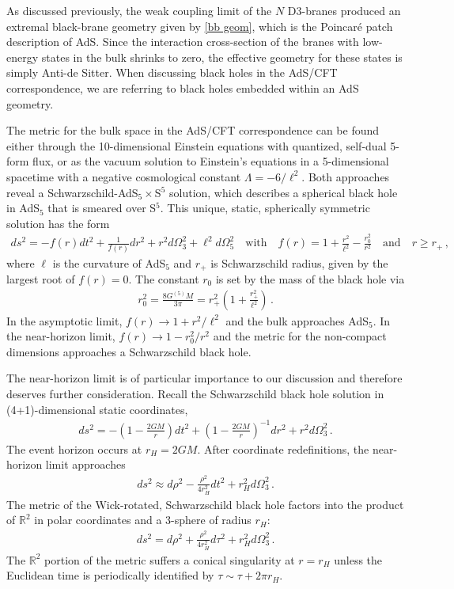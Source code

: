 \documentclass[../PhD.tex]{subfiles}
\begin{document}
As discussed previously, the weak coupling limit of the $N$ D3-branes produced an extremal black-brane geometry given by \eqref{bb geom}, which is the Poincar\'e patch description of AdS. Since the interaction cross-section of the branes with low-energy states in the bulk shrinks to zero, the effective geometry for these states is  simply Anti-de Sitter. When discussing black holes in the AdS/CFT correspondence, we are referring to black holes embedded within an AdS geometry. 

The metric for the bulk space in the AdS/CFT correspondence can be found either through the 10-dimensional Einstein equations with quantized, self-dual 5-form flux, or as the vacuum solution to Einstein's equations in a 5-dimensional spacetime with a negative cosmological constant $\Lambda = -6/\ell^2$. Both approaches reveal a Schwarzschild-AdS$_5 \times$S$^5$ solution, which describes a spherical black hole in AdS$_5$ that is smeared over S$^5$. This unique, static, spherically symmetric solution has the form
\begin{align}
\label{AdS5xS5 bh}
ds^2 = -f(r) dt^2 + \frac{1}{f(r)} dr^2 + r^2 d\Omega^2_3 + \ell^2 d\Omega_5^2 \quad \text{with} \quad f(r) = 1 + \frac{r^2}{\ell^2} - \frac{r_0^2}{r^2} \quad \text{and} \quad r \geq r_+ \, ,
\end{align}
where $\ell$ is the curvature of AdS$_5$ and $r_+$ is Schwarzschild radius, given by the largest root of $f(r)= 0$. The constant $r_0$ is set by the mass of the black hole via
\begin{align}
r_0^2 = \frac{8 G^{(5)} M}{3\pi} = r_+^2 \left( 1 + \frac{r_+^2}{\ell^2} \right) \, .
\end{align}
In the asymptotic limit, $f(r) \to 1 + r^2 / \ell^2$ and the bulk approaches AdS$_5$. In the near-horizon limit, $f(r) \to 1 - r_0^2/r^2$ and the metric for the non-compact dimensions approaches a Schwarzschild black hole.

The near-horizon limit is of particular importance to our discussion and therefore deserves further consideration. Recall the Schwarzschild black hole solution in (4+1)-dimensional static coordinates,
\begin{align}
ds^2 = -\left( 1 - \frac{2GM}{r} \right) dt^2 + \left(1- \frac{2GM}{r}\right)^{-1} dr^2 + r^2 d\Omega_3^2 \, .
\end{align}
The event horizon occurs at $r_H = 2GM$. After coordinate redefinitions, the near-horizon limit approaches
\begin{align}
ds^2 \approx d\rho^2 - \frac{\rho^2}{4r_H^2}dt^2 + r_H^2 d\Omega_3^2 \, .
\end{align}
The metric of the Wick-rotated, Schwarzschild black hole factors into the product of $\mathbb R^2$ in polar coordinates and a 3-sphere of radius $r_H$:
\begin{align}
\label{near-horizon thermal bh}
ds^2 = d\rho^2 + \frac{\rho^2}{4r_H^2} d\tau^2 + r_H^2 d\Omega^2_3 \, .
\end{align}
The $\mathbb R^2$ portion of the metric suffers a conical singularity at $r=r_H$ unless the Euclidean time is periodically identified by $\tau \sim \tau + 2\pi r_H$.
\end{document}
